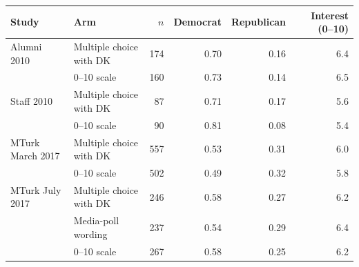 \begin{tabular}{llrrrr}
\toprule
Study & Arm & $n$ & Democrat & Republican & Interest (0--10) \\
\midrule
Alumni 2010 & Multiple choice with DK & 174 & 0.70 & 0.16 & 6.4 \\
 & 0--10 scale & 160 & 0.73 & 0.14 & 6.5 \\
Staff 2010 & Multiple choice with DK &  87 & 0.71 & 0.17 & 5.6 \\
 & 0--10 scale &  90 & 0.81 & 0.08 & 5.4 \\
MTurk March 2017 & Multiple choice with DK & 557 & 0.53 & 0.31 & 6.0 \\
 & 0--10 scale & 502 & 0.49 & 0.32 & 5.8 \\
MTurk July 2017 & Multiple choice with DK & 246 & 0.58 & 0.27 & 6.2 \\
 & Media-poll wording & 237 & 0.54 & 0.29 & 6.4 \\
 & 0--10 scale & 267 & 0.58 & 0.25 & 6.2 \\
\bottomrule
\end{tabular}
